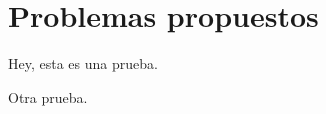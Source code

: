 \section{Problemas propuestos}

\begin{section-problem}
    Hey, esta es una prueba.
\end{section-problem}

\begin{lemma}
    Otra prueba.
\end{lemma}
